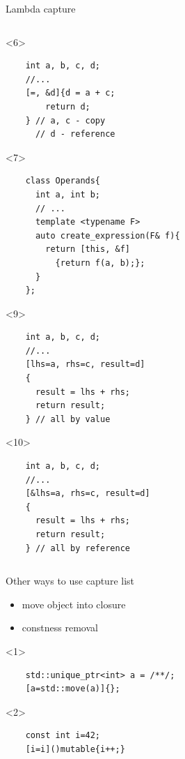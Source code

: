 \documentclass[10pt]{beamer}
\begin{document}
\begin{frame}[fragile]{Lambda capture}
\begin{columns}
\begin{column}{0.6\linewidth}
			\begin{onlyenv}<6>
				\begin{verbatim}
    int a, b, c, d;
    //...
    [=, &d]{d = a + c;
        return d;
    } // a, c - copy
      // d - reference
				\end{verbatim}
			\end{onlyenv}
			\begin{onlyenv}<7>
				\begin{verbatim}
    class Operands{
      int a, int b;
      // ...
      template <typename F>
      auto create_expression(F& f){
        return [this, &f]
      	  {return f(a, b);};
      }
    };
				\end{verbatim}
			\end{onlyenv}
			\begin{onlyenv}<9>
				\begin{verbatim}
    int a, b, c, d;
    //...
    [lhs=a, rhs=c, result=d]
    {
      result = lhs + rhs;
      return result;
    } // all by value
				\end{verbatim}
			\end{onlyenv}
			\begin{onlyenv}<10>
				\begin{verbatim}
    int a, b, c, d;
    //...
    [&lhs=a, rhs=c, result=d]
    {
      result = lhs + rhs;
      return result;
    } // all by reference
				\end{verbatim}
			\end{onlyenv}
		\end{column}
	\end{columns}
\end{frame}

\begin{frame}[fragile]{Other ways to use capture list}
	\begin{itemize}[<+- |alert@+>]
		\item move object into closure
		\item constness removal
	\end{itemize}

	\begin{onlyenv}
	\begin{verbatim}
	std::unique_ptr<int> a = /**/;
	[a=std::move(a)]{};
	\end{verbatim}
	\end{onlyenv}

	\begin{onlyenv}
	\begin{verbatim}
	const int i=42;
	[i=i]()mutable{i++;}
	\end{verbatim}
	\end{onlyenv}

\end{frame}
\end{document}
